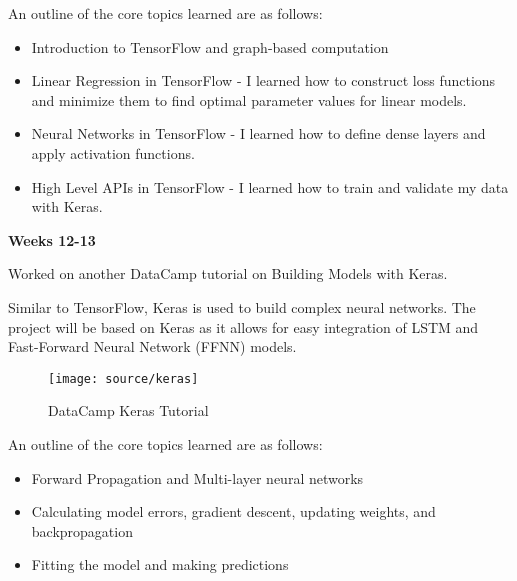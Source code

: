 \documentclass[12pt,twocolumn]{article}
\begin{document}
			An outline of the core topics learned are as follows:
			\begin{itemize}
				\item Introduction to TensorFlow and graph-based computation
				\item Linear Regression in TensorFlow - I learned how to construct loss functions and minimize them to find optimal parameter values for linear models.
				\item Neural Networks in TensorFlow - I learned how to define dense layers and apply activation functions.
				\item High Level APIs in TensorFlow - I learned how to train and validate my data with Keras.
			\end{itemize}
		\textbf{Weeks 12-13}

			Worked on another DataCamp tutorial on Building Models with Keras.

			Similar to TensorFlow, Keras is used to build complex neural networks. The project will be based on Keras as it allows for easy integration of LSTM and Fast-Forward Neural Network (FFNN) models.
			\newline

			\begin{figure}[!h]
				\centering
				\texttt{[image: source/keras]}
				\caption{DataCamp Keras Tutorial}
			\end{figure}

			An outline of the core topics learned are as follows:
			\begin{itemize}
				\item Forward Propagation and Multi-layer neural networks
				\item Calculating model errors, gradient descent, updating weights, and backpropagation
				\item Fitting the model and making predictions
			\end{itemize}
\end{document}
